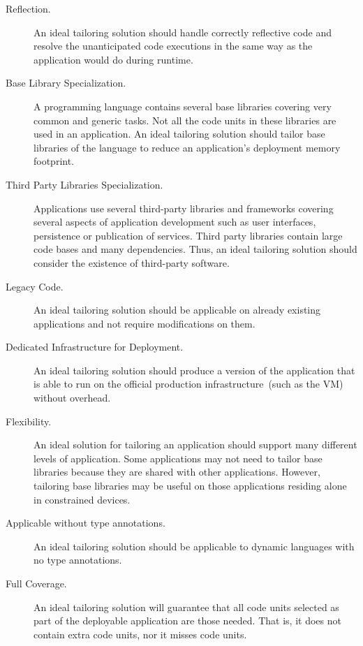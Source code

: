 \begin{description}

\item[Reflection.] An ideal tailoring solution should handle correctly reflective code and resolve the unanticipated code executions in the same way as the application would do during runtime.

\item[Base Library Specialization.] A programming language contains several base libraries covering very common and generic tasks. Not all the code units in these libraries are used in an application. An ideal tailoring solution should tailor base libraries of the language to reduce an application's deployment memory footprint.

\item[Third Party Libraries Specialization.] Applications use several third-party libraries and frameworks covering several aspects of application development such as user interfaces, persistence or publication of services. Third party libraries contain large code bases and many dependencies. Thus, an ideal tailoring solution should consider the existence of third-party software.

\item[Legacy Code.] An ideal tailoring solution should be applicable on already existing applications and not require modifications on them.

\item[Dedicated Infrastructure for Deployment.] An ideal tailoring solution should produce a version of the application that is able to run on the official production infrastructure~(such as the VM) without overhead.

\item[Flexibility.] An ideal solution for tailoring an application should support many different levels of application. Some applications may not need to tailor base libraries because they are shared with other applications. However, tailoring base libraries may be useful on those applications residing alone in constrained devices.

\item[Applicable without type annotations.] An ideal tailoring solution should be applicable to dynamic languages with no type annotations.

\item[Full Coverage.] An ideal tailoring solution will guarantee that all code units selected as part of the deployable application are those needed. That is, it does not contain extra code units, nor it misses code units.

\end{description}


